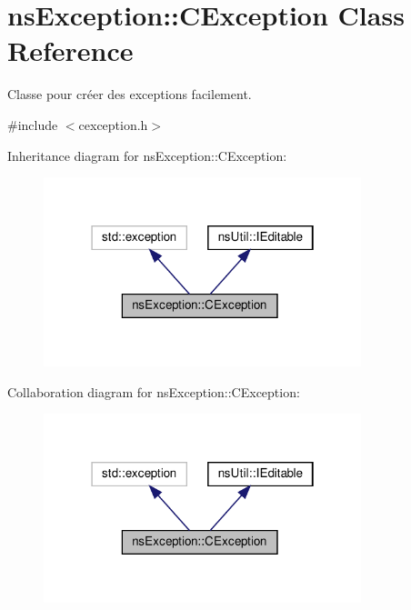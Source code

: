 \hypertarget{classns_exception_1_1_c_exception}{}\section{ns\+Exception\+:\+:C\+Exception Class Reference}
\label{classns_exception_1_1_c_exception}


Classe pour créer des exceptions facilement.  




{\ttfamily \#include $<$cexception.\+h$>$}



Inheritance diagram for ns\+Exception\+:\+:C\+Exception\+:
\nopagebreak
\begin{figure}[H]
\begin{center}
\leavevmode
\includegraphics[width=262pt]{classns_exception_1_1_c_exception__inherit__graph}
\end{center}
\end{figure}


Collaboration diagram for ns\+Exception\+:\+:C\+Exception\+:
\nopagebreak
\begin{figure}[H]
\begin{center}
\leavevmode
\includegraphics[width=262pt]{classns_exception_1_1_c_exception__coll__graph}
\end{center}
\end{figure}
